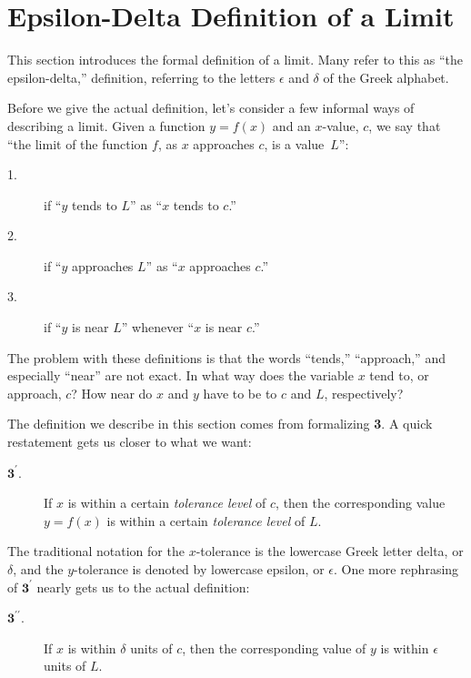 \section{Epsilon-Delta Definition of a Limit}\label{sec:limit_def}

This section introduces the formal definition of a limit. Many refer to this as ``the epsilon-delta,'' definition, referring to the letters $\epsilon$ and $\delta$ of the Greek alphabet.\bigskip

Before we give the actual definition, let's consider a few informal ways of describing a limit.  Given a function $y=f(x)$ and an $x$-value, $c$, we say that ``the limit of the function $f$, as $x$ approaches $c$, is a value~$L$'': 

\begin{description}
\item[1.]if ``$y$ tends to $L$'' as ``$x$ tends to $c$.''
\item[2.]if ``$y$ approaches $L$'' as ``$x$ approaches $c$.''
\item[3.]if ``$y$ is near $L$'' whenever ``$x$ is near $c$.''
\end{description}

The problem with these definitions is that the words ``tends,'' ``approach,'' and especially ``near'' are not exact.  In what way does the variable $x$ tend to, or approach, $c$? How near do $x$ and $y$ have to be to $c$ and $L$, respectively?\bigskip

The definition we describe in this section comes from formalizing \textbf{3}.  A quick restatement gets us closer to what we want:

\begin{description}
\item[$\textbf{3}^\prime$.]If $x$ is within a certain \emph{tolerance level} of $c$, then the corresponding value $y=f(x)$ is within a certain \emph{tolerance level} of $L$.
\end{description}

The traditional notation for the $x$-tolerance is the lowercase Greek letter delta, or $\delta$, and the $y$-tolerance is denoted by lowercase epsilon, or $\epsilon$. One more rephrasing of $\textbf{3}^\prime$ nearly gets us to the actual definition:

\begin{description}
\item[$\textbf{3}^{\prime \prime}$.]If $x$ is within $\delta$ units of $c$, then the corresponding value of $y$ is within $\epsilon$ units of $L$.
\end{description}

